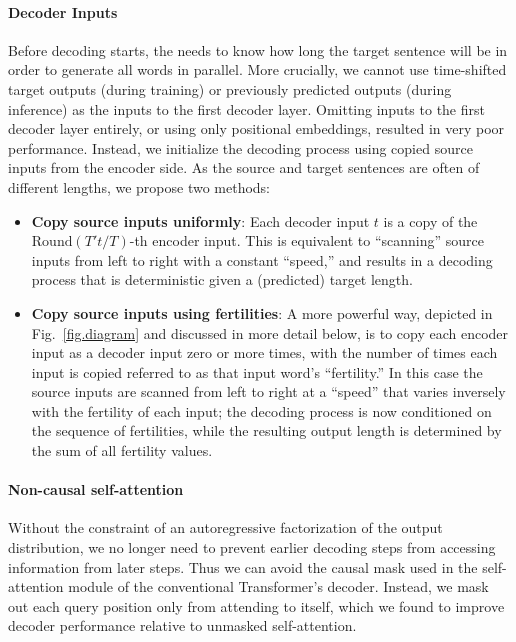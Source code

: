 \documentclass{article} %
\begin{document}
\paragraph{Decoder Inputs}
Before decoding starts, the \model{} needs to know how long the target sentence will be in order to generate all words in parallel.
More crucially, we cannot use time-shifted target outputs (during training) or previously predicted outputs (during inference) as the inputs to the first decoder layer.
Omitting inputs to the first decoder layer entirely, or using only positional embeddings, resulted in very poor performance.
Instead, we initialize the decoding process using copied source inputs from the encoder side. As the source and target sentences are often of different lengths, we propose two methods:
\begin{itemize}[leftmargin=*]
\item \textbf{Copy source inputs uniformly}: Each decoder input $t$ is a copy of the $\text{Round}(T't/T)$-th encoder input. This is equivalent to ``scanning'' source inputs from left to right with a constant ``speed,'' and results in a decoding process that is deterministic given a (predicted) target length.
\item \textbf{Copy source inputs using fertilities}: A more powerful way, depicted in Fig.~\ref{fig.diagram} and discussed in more detail below, 
is to copy each encoder input as a decoder input zero or more times, with the number of times each input is copied referred to as that input word's ``fertility.''
In this case the source inputs are scanned from left to right at a ``speed'' that varies inversely with the fertility of each input; the decoding process is now conditioned on the sequence of fertilities, while the resulting output length is determined by the sum of all fertility values. 
\end{itemize}

\vspace{-5pt}
\paragraph{Non-causal self-attention}
Without the constraint of an autoregressive factorization of the output distribution, we no longer need to prevent earlier decoding steps from accessing information from later steps. Thus we can avoid the causal mask used in the self-attention module of the conventional Transformer's decoder. Instead, we  mask out each query position only from attending to itself, which we found to improve decoder performance relative to unmasked self-attention.
\end{document}
